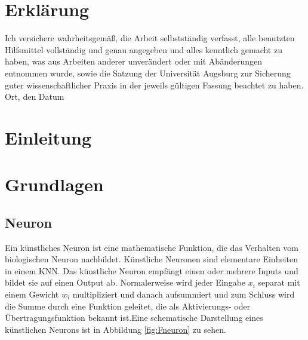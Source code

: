 \documentclass[12pt,a4paper]{scrartcl}
\numberwithin{equation}{section}
\begin{document}
    \section*{Erklärung}
  
  Ich  versichere  wahrheitsgemäß,  die  Arbeit selbstständig verfasst,  alle  benutzten  Hilfsmittel  vollständig  und  genau  angegeben  und  alles kenntlich  gemacht  zu  haben,  was  aus  Arbeiten  anderer  unverändert  oder  mit  Abänderungen entnommen  wurde,  sowie die Satzung  der  Universität Augsburg  zur  Sicherung guter wissenschaftlicher Praxis in der jeweils gültigen Fassung beachtet zu haben.
  \\[2ex] 
  
  \noindent
  Ort, den Datum\\[5ex]
 

\newpage
 \tableofcontents


  \pagestyle{headings}
 \newpage
%
\begin{acronym}[THIBAUT]
\end{acronym}
\newpage
\section{Einleitung}



 \newpage  %
 
\section{Grundlagen}\label{Grundlaagen}
\subsection{Neuron}
Ein künstliches Neuron\cite{kneuron} ist eine mathematische Funktion, die das Verhalten vom biologischen Neuron nachbildet. Künstliche Neuronen sind elementare Einheiten in einem \ac{KNN}. Das künstliche Neuron empfängt einen oder mehrere Inputs und bildet sie auf einen Output ab. Normalerweise wird jeder Eingabe $ x_i $ separat mit einem Gewicht $ w_i $ multipliziert und danach aufsummiert und zum Schluss wird die Summe durch eine Funktion geleitet, die als Aktivierungs- oder Übertragungsfunktion bekannt ist.Eine schematische Darstellung eines künstlichen Neurons ist in Abbildung \ref{fig:Fneuron}
zu sehen.
\end{document}
